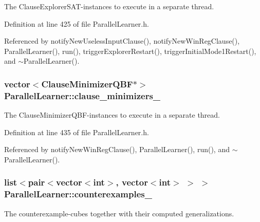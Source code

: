 The Clause\-Explorer\-S\-A\-T-\/instances to execute in a separate thread. 



Definition at line 425 of file Parallel\-Learner.\-h.



Referenced by notify\-New\-Useless\-Input\-Clause(), notify\-New\-Win\-Reg\-Clause(), Parallel\-Learner(), run(), trigger\-Explorer\-Restart(), trigger\-Initial\-Mode1\-Restart(), and $\sim$\-Parallel\-Learner().

\hypertarget{classParallelLearner_adb5aa1e016e04c607073eaf90d994dc7}{
\subsubsection[{clause\-\_\-minimizers\-\_\-}]{\setlength{\rightskip}{0pt plus 5cm}vector$<${\bf Clause\-Minimizer\-Q\-B\-F}$\ast$$>$ Parallel\-Learner\-::clause\-\_\-minimizers\-\_\-\hspace{0.3cm}{\ttfamily [protected]}}}\label{classParallelLearner_adb5aa1e016e04c607073eaf90d994dc7}


The Clause\-Minimizer\-Q\-B\-F-\/instances to execute in a separate thread. 



Definition at line 435 of file Parallel\-Learner.\-h.



Referenced by notify\-New\-Win\-Reg\-Clause(), Parallel\-Learner(), run(), and $\sim$\-Parallel\-Learner().

\hypertarget{classParallelLearner_a974943e3e2145b3407f689b64acdd33f}{
\subsubsection[{counterexamples\-\_\-}]{\setlength{\rightskip}{0pt plus 5cm}list$<$pair$<$vector$<$int$>$, vector$<$int$>$ $>$ $>$ Parallel\-Learner\-::counterexamples\-\_\-}}\label{classParallelLearner_a974943e3e2145b3407f689b64acdd33f}


The counterexample-\/cubes together with their computed generalizations. 

